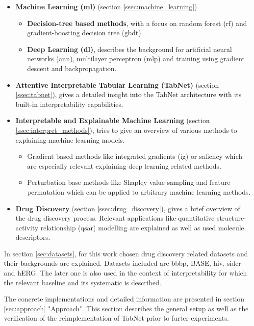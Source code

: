 \documentclass[../main.tex]{subfiles}
\begin{document}
\begin{itemize}
   \item \textbf{Machine Learning (\acs{ml})} (section \ref{ssec:machine_learning}) 
      \begin{itemize}
         \item \textbf{Decision-tree based methods}, with a focus on random forest (\acs{rf}) and gradient-boosting decision tree (\acs{gbdt}).   
         \item \textbf{Deep Learning (\acs{dl})}, describes the background for artificial neural networks (\acs{ann}), multilayer perceptron (\acs{mlp}) and training using gradient descent and backpropagation.
      \end{itemize}
   \item \textbf{Attentive Interpretable Tabular Learning (TabNet)} (section \ref{ssec:tabnet}), gives a detailed insight into the TabNet architecture with its built-in interpretability capabilities. 
   \item \textbf{Interpretable and Explainable Machine Learning} (section \ref{ssec:interpret_methods}), tries to give an overview of various methods to explaining machine learning models.
      \begin{itemize}
         \item Gradient based methods like integrated gradients (\acs{ig}) or saliency which are especially relevant explaining deep learning related methods.
         \item Perturbation base methods like Shapley value sampling and feature permutation which can be applied to arbitrary machine learning methods.
      \end{itemize}
   \item \textbf{Drug Discovery} (section \ref{ssec:drug_discovery}), gives a brief overview of the drug discovery process. Relevant applications like quantitative structure-activity relationship (\acs{qsar}) modelling are explained as well as used molecule descriptors.     
\end{itemize}

In section \ref{sec:datasets}, for this work chosen drug discovery related datasets and their backgrounds are explained. Datasets included are \acs{bbbp}, BASE, \acs{hiv}, \acs{sider} and hERG. The later one is also used in the context of interpretability for which the relevant baseline and its systematic is described.
\newline

The concrete implementations and detailed information are presented in section \ref{sec:approach} "Approach". This section describes the general setup as well as the verification of the reimplementation of TabNet prior to furter experiments. 
\newline
\end{document}
